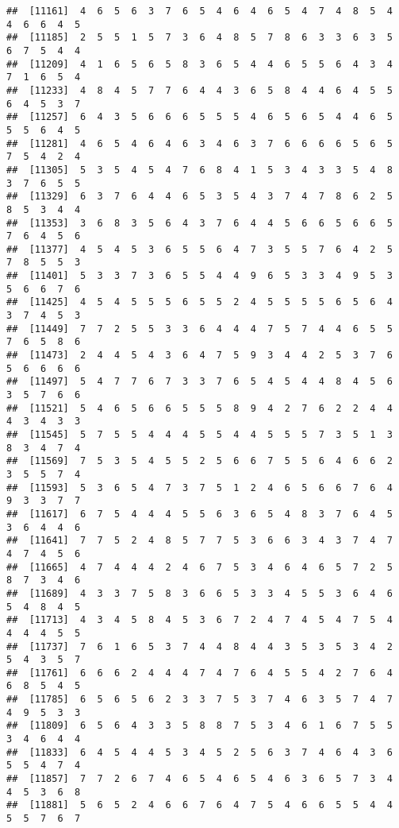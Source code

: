 \documentclass[
]{book}
\begin{document}
\begin{verbatim}
##  [11161]  4  6  5  6  3  7  6  5  4  6  4  6  5  4  7  4  8  5  4  4  6  6  4  5
##  [11185]  2  5  5  1  5  7  3  6  4  8  5  7  8  6  3  3  6  3  5  6  7  5  4  4
##  [11209]  4  1  6  5  6  5  8  3  6  5  4  4  6  5  5  6  4  3  4  7  1  6  5  4
##  [11233]  4  8  4  5  7  7  6  4  4  3  6  5  8  4  4  6  4  5  5  6  4  5  3  7
##  [11257]  6  4  3  5  6  6  6  5  5  5  4  6  5  6  5  4  4  6  5  5  5  6  4  5
##  [11281]  4  6  5  4  6  4  6  3  4  6  3  7  6  6  6  6  5  6  5  7  5  4  2  4
##  [11305]  5  3  5  4  5  4  7  6  8  4  1  5  3  4  3  3  5  4  8  3  7  6  5  5
##  [11329]  6  3  7  6  4  4  6  5  3  5  4  3  7  4  7  8  6  2  5  8  5  3  4  4
##  [11353]  3  6  8  3  5  6  4  3  7  6  4  4  5  6  6  5  6  6  5  7  6  4  5  6
##  [11377]  4  5  4  5  3  6  5  5  6  4  7  3  5  5  7  6  4  2  5  7  8  5  5  3
##  [11401]  5  3  3  7  3  6  5  5  4  4  9  6  5  3  3  4  9  5  3  5  6  6  7  6
##  [11425]  4  5  4  5  5  5  6  5  5  2  4  5  5  5  5  6  5  6  4  3  7  4  5  3
##  [11449]  7  7  2  5  5  3  3  6  4  4  4  7  5  7  4  4  6  5  5  7  6  5  8  6
##  [11473]  2  4  4  5  4  3  6  4  7  5  9  3  4  4  2  5  3  7  6  5  6  6  6  6
##  [11497]  5  4  7  7  6  7  3  3  7  6  5  4  5  4  4  8  4  5  6  3  5  7  6  6
##  [11521]  5  4  6  5  6  6  5  5  5  8  9  4  2  7  6  2  2  4  4  4  3  4  3  3
##  [11545]  5  7  5  5  4  4  4  5  5  4  4  5  5  5  7  3  5  1  3  8  3  4  7  4
##  [11569]  7  5  3  5  4  5  5  2  5  6  6  7  5  5  6  4  6  6  2  3  5  5  7  4
##  [11593]  5  3  6  5  4  7  3  7  5  1  2  4  6  5  6  6  7  6  4  9  3  3  7  7
##  [11617]  6  7  5  4  4  4  5  5  6  3  6  5  4  8  3  7  6  4  5  3  6  4  4  6
##  [11641]  7  7  5  2  4  8  5  7  7  5  3  6  6  3  4  3  7  4  7  4  7  4  5  6
##  [11665]  4  7  4  4  4  2  4  6  7  5  3  4  6  4  6  5  7  2  5  8  7  3  4  6
##  [11689]  4  3  3  7  5  8  3  6  6  5  3  3  4  5  5  3  6  4  6  5  4  8  4  5
##  [11713]  4  3  4  5  8  4  5  3  6  7  2  4  7  4  5  4  7  5  4  4  4  4  5  5
##  [11737]  7  6  1  6  5  3  7  4  4  8  4  4  3  5  3  5  3  4  2  5  4  3  5  7
##  [11761]  6  6  6  2  4  4  4  7  4  7  6  4  5  5  4  2  7  6  4  6  8  5  4  5
##  [11785]  6  5  6  5  6  2  3  3  7  5  3  7  4  6  3  5  7  4  7  4  9  5  3  3
##  [11809]  6  5  6  4  3  3  5  8  8  7  5  3  4  6  1  6  7  5  5  3  4  6  4  4
##  [11833]  6  4  5  4  4  5  3  4  5  2  5  6  3  7  4  6  4  3  6  5  5  4  7  4
##  [11857]  7  7  2  6  7  4  6  5  4  6  5  4  6  3  6  5  7  3  4  4  5  3  6  8
##  [11881]  5  6  5  2  4  6  6  7  6  4  7  5  4  6  6  5  5  4  4  5  5  7  6  7

\end{verbatim}
\end{document}
